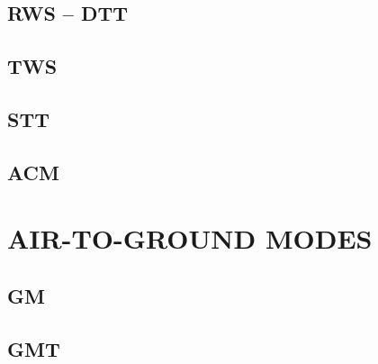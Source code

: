 \subsection{RWS -- DTT}

\subsection{TWS}

\subsection{STT}

\subsection{ACM}

\clearpage 

\section{AIR-TO-GROUND MODES}

\subsection{GM}

\subsection{GMT}

\cleardoublepage